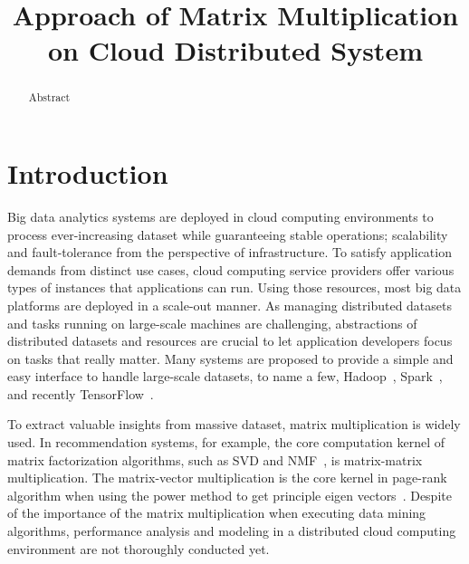 \documentclass[10pt, conference, compsocconf]{IEEEtran}
\begin{document}

\title{Approach of Matrix Multiplication on Cloud Distributed System}


\author{
\and
{}
}

\maketitle

\begin{abstract}
Abstract
\end{abstract}

\IEEEpeerreviewmaketitle

\section{Introduction}\label{sec:intro}
Big data analytics systems are deployed in cloud computing environments to process ever-increasing dataset while guaranteeing stable operations; scalability and fault-tolerance from the perspective of infrastructure. To satisfy application demands from distinct use cases, cloud computing service providers offer various types of instances that applications can run. Using those resources, most big data platforms are deployed in a scale-out manner. As managing distributed datasets and tasks running on large-scale machines are challenging, abstractions of distributed datasets and resources are crucial to let application developers focus on tasks that really matter. Many systems are proposed to provide a simple and easy interface to handle large-scale datasets, to name a few, Hadoop~\cite{hadoop}, Spark~\cite{spark}, and recently TensorFlow~\cite{tensorflow}.

To extract valuable insights from massive dataset, matrix multiplication is widely used. In recommendation systems, for example, the core computation kernel of matrix factorization algorithms, such as SVD and NMF~\cite{nmf}, is matrix-matrix multiplication. The matrix-vector multiplication is the core kernel in page-rank algorithm when using the power method to get principle eigen vectors~\cite{pagerank}. Despite of the importance of the matrix multiplication when executing data mining algorithms, performance analysis and modeling in a distributed cloud computing environment are not thoroughly conducted yet.
\end{document}
